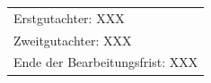 \begin{titlepage}
    \vspace*{\fill}
    \begin{flushleft}
    \begin{tabular}{l}
    Erstgutachter: XXX\\

    Zweitgutachter: XXX\\

    Ende der Bearbeitungsfrist: XXX
    \end{tabular}
    \end{flushleft}
    \vspace{-1cm}

\end{titlepage}
